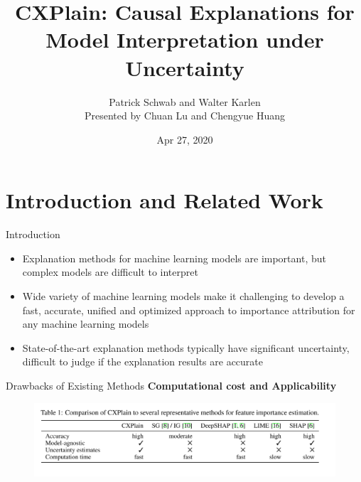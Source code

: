 \documentclass[10pt]{beamer}
\title{CXPlain: Causal Explanations for Model Interpretation under Uncertainty}
\date{Apr 27, 2020}
\author[Patrick Schwab and Walter Karlen]{Patrick Schwab and Walter Karlen \\[5pt]
\small{Presented by Chuan Lu and Chengyue Huang}}
\begin{document}
\maketitle

\begin{frame}
\tableofcontents
\end{frame}

\section{Introduction and Related Work}

\begin{frame}{Introduction}
\begin{itemize}
\item Explanation methods for machine learning models are important, but complex models are difficult to interpret
\item Wide variety of machine learning models make it challenging to develop a fast, accurate, unified and optimized approach to importance attribution for any machine learning models
\item State-of-the-art explanation methods typically have significant uncertainty, difficult to judge if the explanation results are accurate

\end{itemize}
\end{frame}

\begin{frame}{Drawbacks of Existing Methods}
\textbf{Computational cost and Applicability}
\begin{figure}
\centering
\includegraphics[width=\textwidth]{figures/introduction/table1.png}
\end{figure}
\end{frame}
\end{document}
